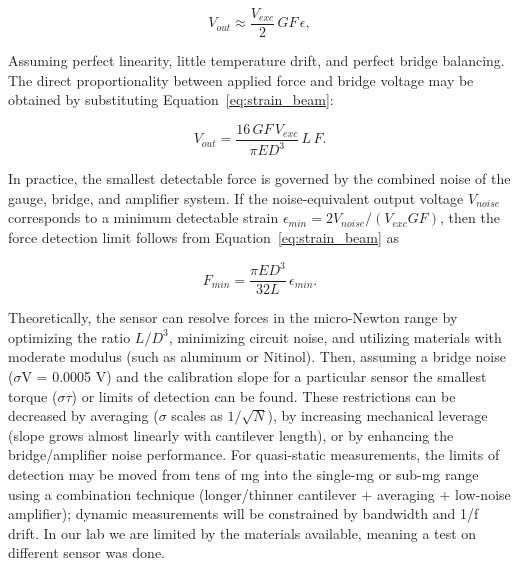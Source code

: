 \begin{equation}
	V_{out} \approx \frac{V_{exc}}{2} \, GF \, \epsilon,
	\label{eq:bridge_output}
\end{equation}

\noindent Assuming perfect linearity, little temperature drift, and perfect bridge balancing. The direct proportionality between applied force and bridge voltage may be obtained by substituting Equation~\ref{eq:strain_beam}:

\begin{equation}
	V_{out} = \frac{16 \, GF \, V_{exc}}{\pi E D^3} \, L \, F.
	\label{eq:force_to_voltage}
\end{equation}

In practice, the smallest detectable force is governed by the combined noise of the gauge, bridge, and amplifier system. 
If the noise-equivalent output voltage $V_{noise}$ corresponds to a minimum detectable strain $\epsilon_{min} = 2V_{noise}/(V_{exc} GF)$, then the force detection limit follows from Equation~\ref{eq:strain_beam} as

\begin{equation}
	F_{min} = \frac{\pi E D^3}{32 L} \, \epsilon_{min}.
	\label{eq:force_limit}
\end{equation}

Theoretically, the sensor can resolve forces in the micro-Newton range by optimizing the ratio $L/D^3$, minimizing circuit noise, and utilizing materials with moderate modulus (such as aluminum or Nitinol). Then, assuming a bridge noise ($\sigma$V = 0.0005 V) and the calibration slope for a particular sensor the smallest torque ($\sigma\tau$) or limits of detection can be found. These restrictions can be decreased by averaging ($\sigma$ scales as $1/\sqrt{N}$), by increasing mechanical leverage (slope grows almost linearly with cantilever length), or by enhancing the bridge/amplifier noise performance. For quasi-static measurements, the limits of detection may be moved from tens of mg into the single-mg or sub-mg range using a combination technique (longer/thinner cantilever + averaging + low-noise amplifier); dynamic measurements will be constrained by bandwidth and 1/f drift. In our lab we are limited by the materials available, meaning a test on different sensor was done.
